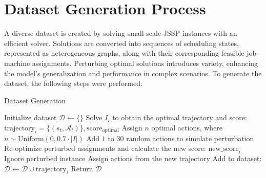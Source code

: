 \section{Dataset Generation Process}
\label{app:dataset}

A diverse dataset is created by solving small-scale JSSP instances with an efficient solver. Solutions are converted into sequences of scheduling states, represented as heterogeneous graphs, along with their corresponding feasible job-machine assignments. Perturbing optimal solutions introduces variety, enhancing the model's generalization and performance in complex scenarios. To generate the dataset, the following steps were performed:

\begin{algorithm}[H]
\caption{Dataset Generation}
\begin{algorithmic}[1]
\STATE Initialize dataset $\mathcal{D} \gets \{\}$
    \STATE Solve $I_i$ to obtain the optimal trajectory and score: $\text{trajectory}_i = \{(s_t, \mathcal{A}_t)\}, \text{score}_\text{optimal}$
    \STATE Assign $n$ optimal actions, where $n \sim \text{Uniform}(0, 0.7 \cdot |I|)$
    \STATE Add $1$ to $30$ random actions to simulate perturbation
    \STATE Re-optimize perturbed assignments and calculate the new score: $\text{new\_score}_i$
        \STATE Ignore perturbed instance
    \ELSE
        \STATE Assign actions from the new trajectory
        \STATE Add to dataset: $\mathcal{D} \gets \mathcal{D} \cup \text{trajectory}_i$
    \ENDIF
\ENDFOR
\STATE Return $\mathcal{D}$
\end{algorithmic}
\end{algorithm}


